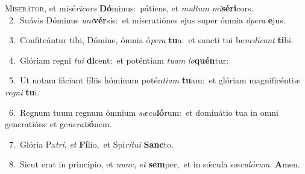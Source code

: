 \lettrine{\initial\textcolor{\initialcolor}{M}}{iserátor,} et misé\-\textit{ri}\-\textit{cors} \textbf{Dó}\-minus:~\star pátiens, et \textit{mul}\-\textit{tum} \textit{mi}\-\textbf{sé}\textbf{ri}cors.\\
{\numbfont\textcolor{\numbcolor}{~2.}}~Suávis Dóminus \textit{u}\-\textit{ni}\textbf{vér}sis:~\star et miseratiónes ejus super ómnia \textit{ó}\-\textit{pe}\textit{ra} \textbf{e}\-jus.\par
{\numbfont\textcolor{\numbcolor}{~3.}}~Confiteántur tibi, Dómine, ómnia ó\-\textit{pe}\-\textit{ra} \textbf{tu}\-a:~\star et sancti tui be\-\textit{ne}\-\textit{dí}\textit{cant} \textbf{ti}\-bi.\par
{\numbfont\textcolor{\numbcolor}{~4.}}~Glóriam regni \textit{tu}\-\textit{i} \textbf{di}\-cent:~\star et poténtiam \textit{tu}\-\textit{am} \textit{lo}\-\textbf{quén}tur:\par
{\numbfont\textcolor{\numbcolor}{~5.}}~Ut notam fáciant fíliis hóminum potén\-\textit{ti}\-\textit{am} \textbf{tu}\-am:~\star et glóriam magnificénti\textit{æ} \textit{re}\-\textit{gni} \textbf{tu}\-i.\par
{\numbfont\textcolor{\numbcolor}{~6.}}~Regnum tuum regnum ómnium \textit{sæ}\-\textit{cu}\textbf{ló}rum:~\star et dominátio tua in omni generatióne et ge\-\textit{ne}\-\textit{ra}\textit{ti}\textbf{ó}nem.\par
{\numbfont\textcolor{\numbcolor}{~7.}}~Glória Pa\-\textit{tri}\-, \textit{et} \textbf{Fí}\-lio,~\star et Spi\-\textit{rí}\-\textit{tu}\textit{i} \textbf{Sanc}\-to.\par
{\numbfont\textcolor{\numbcolor}{~8.}}~Sicut erat in princípio, et \textit{nunc}\-, \textit{et} \textbf{sem}\-per,~\star et in sǽcula sæ\-\textit{cu}\-\textit{ló}\textit{rum}. \textbf{A}\-men.\par

